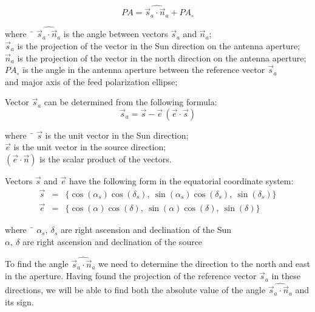 \begin{equation}
    PA = \widehat{ \vec{s}_a \cdot \vec{n}_a } + PA_{\circ}
\label{eq:pa}
\end{equation}
\begin{tabbing}
where~ \= $\widehat{ \vec {s}_a \cdot \vec{n}_a }$ is the angle between vectors $\vec {s}_a$ and $\vec{n}_a$;\\
       \> $\vec {s}_a$ is the projection of the vector in the Sun direction on the antenna aperture;\\
       \> $\vec{n}_a$ is the projection of the vector in the north direction on the antenna aperture;\\
       \>  $PA_{\circ}$ \= is the angle in the antenna aperture between the reference vector $\vec {s}_a$ \\
       \> \> and major axis of the feed polarization ellipse;
\end{tabbing}
Vector $\vec {s}_a$ can be determined from the following formula:
\begin{equation}
  \vec {s}_a = \vec{s} - \vec{e}\, (\vec{e} \cdot \vec{s})
\label{eq:sa}
\end{equation}
\begin{tabbing}
where~ \= $\vec{s}$ is the unit vector in the Sun direction;\\
       \> $\vec{e}$ is the unit vector in the source direction;\\
       \> $(\vec{e} \cdot \vec{n})$ is the scalar product of the vectors.\\
\end{tabbing}
Vectors $\vec{s}$ and $\vec{e}$ have the following form in the equatorial coordinate system:
\begin{eqnarray}
\vec{s} & = & \{ \cos(\alpha_s) \cos(\delta_s),\:
                \sin(\alpha_s) \cos(\delta_s),\:
                \sin(\delta_s)\}
\label{eq:s}
\\
\vec{e} & = & \{ \cos(\alpha) \cos(\delta),\:
                \sin(\alpha) \cos(\delta),\:
                \sin(\delta)\}
\label{eq:e}
\end{eqnarray}
\begin{tabbing}
where~ \= $\alpha_s,\:\delta_s$ are right ascension and declination
            of the Sun\\
       \> $\alpha,\:\delta$ are right ascension and declination
            of the source\\
\end{tabbing}
To find the angle $\widehat{ \vec {s}_a \cdot \vec{n}_a }$ we need to determine the direction to the north and east in the aperture. Having found the projection of the reference vector $\vec {s}_a$ in these directions, we will be able to find both the absolute value of the angle $\widehat{ \vec {s}_a \cdot \vec{n}_a }$ and its sign.
